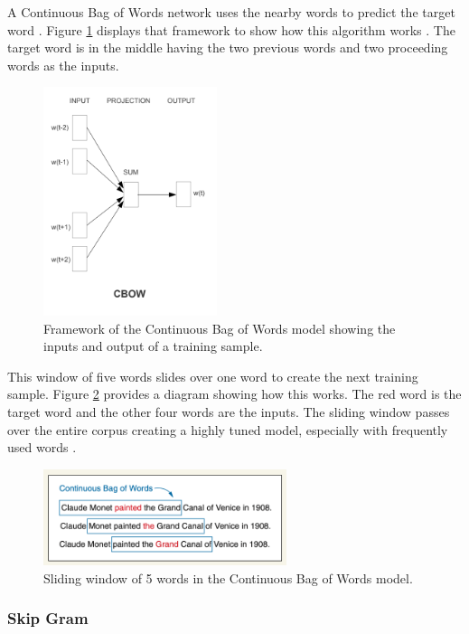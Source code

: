 \documentclass[5p,authoryear]{elsarticle}
\begin{document}
A Continuous Bag of Words network uses the nearby words to predict the target word \citep{lane}.
Figure \ref{cbow} displays that framework to show how this algorithm works \citep{word2vec}. 
The target word is in the middle having the two previous words and two proceeding words as the inputs.

\begin{figure}[!h] 
    \centering
	\includegraphics[width=2in]{figures/cbow.png}
	\caption[]{Framework of the Continuous Bag of Words model showing the inputs and output of a training sample.} 
	\label{cbow} 
\end{figure}



This window of five words slides over one word to create the next training sample.
Figure \ref{cbow_window} provides a diagram showing how this works. 
The red word is the target word and the other four words are the inputs.
The sliding window passes over the entire corpus creating a highly tuned model, especially with frequently used words \citep{lane}.

\begin{figure}[!h] 
    \centering
	\includegraphics[width=2.8in]{figures/cbow_window.png}
	\caption[]{Sliding window of 5 words in the Continuous Bag of Words model.} 
	\label{cbow_window} 
\end{figure}


\subsubsection{Skip Gram}\label{skip}
\end{document}
